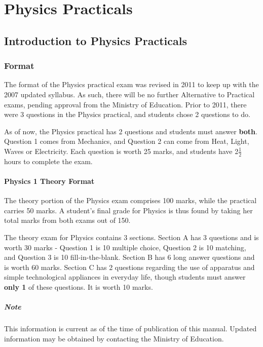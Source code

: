 \chapter{Physics Practicals} 

\section{Introduction to Physics Practicals}

\subsection{Format}
The format of the Physics practical exam was revised in 2011 to keep up with the 2007 updated syllabus. As such, there will be no further Alternative to Practical exams, pending approval from the Ministry of Education. Prior to 2011, there were 3 questions in the Physics practical, and students chose 2 questions to do.

As of now, the Physics practical has 2 questions and students must answer \textbf{both}. Question 1 comes from Mechanics, and Question 2 can come from Heat, Light, Waves or Electricity. Each question is worth 25 marks, and students have 2$\frac{1}{2}$ hours to complete the exam.

\subsubsection{Physics 1 Theory Format}
The theory portion of the Physics exam comprises 100 marks, while the practical carries 50 marks. A student's final grade for Physics is thus found by taking her total marks from both exams out of 150.

The theory exam for Physics contains 3 sections. Section A has 3 questions and is worth 30 marks - Question 1 is 10 multiple choice, Question 2 is 10 matching, and Question 3 is 10 fill-in-the-blank. Section B has 6 long answer questions and is worth 60 marks. Section C has 2 questions regarding the use of apparatus and simple technological appliances in everyday life, though students must answer \textbf{only 1} of these questions. It is worth 10 marks.

\paragraph{Note} This information is current as of the time of publication of this manual. Updated information may be obtained by contacting the Ministry of Education. 

